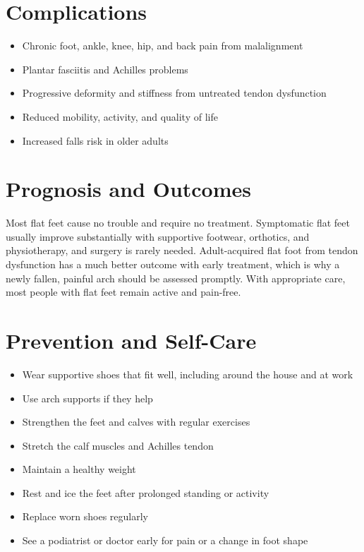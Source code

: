 \section*{Complications}
\begin{itemize}
    \item Chronic foot, ankle, knee, hip, and back pain from malalignment
    \item Plantar fasciitis and Achilles problems
    \item Progressive deformity and stiffness from untreated tendon dysfunction
    \item Reduced mobility, activity, and quality of life
    \item Increased falls risk in older adults
\end{itemize}

\section*{Prognosis and Outcomes}
Most flat feet cause no trouble and require no treatment. Symptomatic flat feet usually improve substantially with supportive footwear, orthotics, and physiotherapy, and surgery is rarely needed. Adult-acquired flat foot from tendon dysfunction has a much better outcome with early treatment, which is why a newly fallen, painful arch should be assessed promptly. With appropriate care, most people with flat feet remain active and pain-free.

\section*{Prevention and Self-Care}
\begin{itemize}
    \item Wear supportive shoes that fit well, including around the house and at work
    \item Use arch supports if they help
    \item Strengthen the feet and calves with regular exercises
    \item Stretch the calf muscles and Achilles tendon
    \item Maintain a healthy weight
    \item Rest and ice the feet after prolonged standing or activity
    \item Replace worn shoes regularly
    \item See a podiatrist or doctor early for pain or a change in foot shape
\end{itemize}

